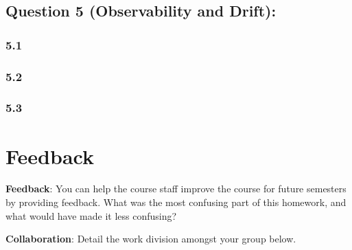 \documentclass[12pt]{article}
\begin{document}
\subsection*{Question 5 (Observability and Drift):}

\subsubsection*{5.1}
\begin{solution}[height=6cm]
\end{solution}

\subsubsection*{5.2}
\begin{solution}[height=6cm]
\end{solution}

\subsubsection*{5.3}
\begin{solution}[height=6cm]
\end{solution}

\newpage
\section*{Feedback}

\textbf{Feedback}: You can help the course staff improve the course for future semesters by providing feedback. What was the most confusing part of this homework, and what would have made it less confusing?
\begin{solution}[height=4cm]
\end{solution}

\textbf{Collaboration}: Detail the work division amongst your group below.
\begin{solution}[height=4cm]
\end{solution}
\end{document}
